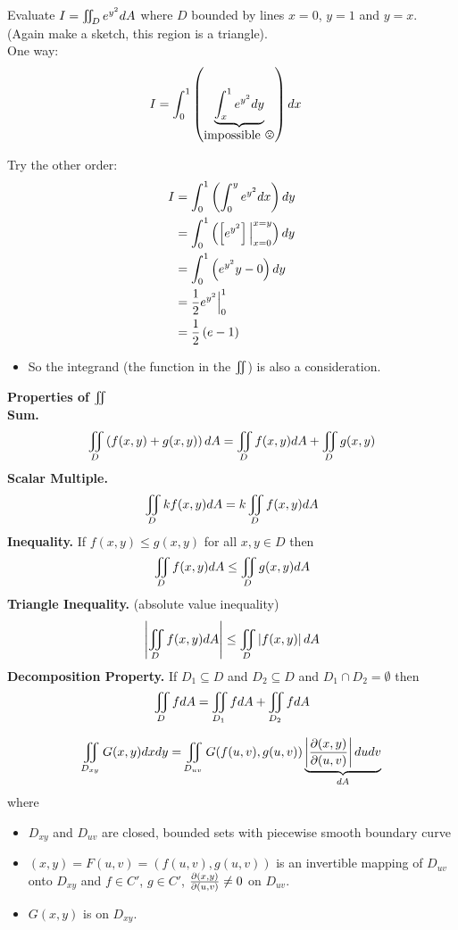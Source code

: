 \documentclass[english, 11pt]{article}
\begin{document}
\begin{exmp}
  Evaluate $I = \iint\displaylimits_D e^{y^2} dA$ where $D$ bounded by lines $x = 0$, $y = 1$ and $y = x$. (Again make a sketch, this region is a triangle). \\

  One way:
  \begin{align*}
    I & = \int_0^1 \left(\ub{\int_x^1 e^{y^2} dy}_{\mbox{impossible \frownie}} \right) dx
  \end{align*}

  Try the other order:
  \begin{align*}
    I & = \int_0^1 \left( \int_0^y e^{y^2} dx \right) dy \\
      & = \int_0^1 \left( \left[ e^{y^2}\right]  \Big|_{x = 0}^{x = y} \right) dy \\
      & = \int_0^1 \left( e^{y^2} y - 0 \right) dy \\
      & = \frac{1}{2}e^{y^2}\Big|_0^1 \\
      & = \frac{1}{2} \left( e -1  \right)
  \end{align*}
  \begin{itemize}
    \item So the integrand (the function in the $\iint\displaylimits$) is also a consideration.
  \end{itemize}
\end{exmp}

\textbf{Properties of $\iint\displaylimits$} \\

\textbf{Sum.} \[\iint\displaylimits_D \left( f(x,y) + g(x,y) \right) dA  = \iint\displaylimits_D f(x,y) dA + \iint\displaylimits_D g(x,y)\]
\textbf{Scalar Multiple.} \[ \iint\displaylimits_D kf(x,y) dA = k\iint\displaylimits_D f(x,y) dA \]
\textbf{Inequality.} If $f(x,y) \leq g(x,y)$ for all $x, y \in D$ then
\[ \iint\displaylimits_D f(x,y) dA \leq \iint\displaylimits_D g(x,y) dA \]
\textbf{Triangle Inequality.} (absolute value inequality)
\[ \left| \iint\displaylimits_D f(x,y) dA \right| \leq \iint\displaylimits_D \left| f(x,y) \right| dA \]
\textbf{Decomposition Property.} If $D_1 \subseteq D$ and $D_2 \subseteq D$ and $D_1 \cap D_2 = \emptyset$ then
\[ \iint\displaylimits_D f dA = \iint\displaylimits_{D_1} f dA + \iint\displaylimits_{D_2} f dA \]

\begin{thrm}\label{changevariablethrm}
\[ \iint\displaylimits_{D_{xy}} G(x,y) dxdy = \iint\displaylimits_{D_{uv}} G(f(u,v), g(u,v)) \underbrace{\left| \frac{\partial(x,y)}{\partial(u,v)}\right| dudv}_{dA} \]
where
\begin{itemize}
  \item $D_{xy}$ and $D_{uv}$ are closed, bounded sets with piecewise smooth boundary curve
  \item $(x,y) = F(u,v) = (f(u,v), g(u,v))$ is an invertible mapping of $D_{uv}$ onto $D_{xy}$ and $f \in C'$, $g \in C'$, $\frac{\partial(x,y)}{\partial(u,v)} \not = 0$ on $D_{uv}$.
  \item $G(x,y)$ is  on $D_{xy}$.
\end{itemize}
\end{thrm}
\end{document}
